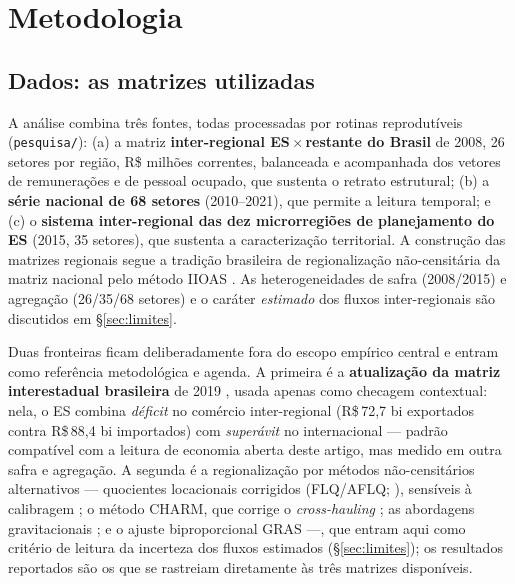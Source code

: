 \documentclass[11pt,a4paper]{article}
\begin{document}
\section{Metodologia}
\label{sec:metodo}
\subsection{Dados: as matrizes utilizadas}
\label{sec:dados}
A análise combina três fontes, todas processadas por rotinas reprodutíveis
(\texttt{pesquisa/}): (a) a matriz \textbf{inter-regional ES\,$\times$\,restante do
Brasil} de 2008, 26 setores por região, R\$ milhões correntes, balanceada e
acompanhada dos vetores de remunerações e de pessoal ocupado, que sustenta o retrato
estrutural; (b) a \textbf{série nacional de 68 setores} (2010--2021), que permite a leitura temporal; e (c) o \textbf{sistema inter-regional das dez microrregiões de planejamento do ES} (2015, 35 setores), que sustenta a caracterização territorial. A construção das matrizes regionais segue a tradição brasileira de regionalização não-censitária da matriz nacional \citep{guilhoto2005estimacao,round1983nonsurvey} pelo método IIOAS \citep{haddad2017iioas}. As heterogeneidades de safra (2008/2015) e agregação
(26/35/68 setores) e o caráter \emph{estimado} dos fluxos inter-regionais são
discutidos em \S\ref{sec:limites}.

Duas fronteiras ficam deliberadamente fora do escopo empírico central e entram como referência metodológica e agenda. A primeira é a \textbf{atualização da matriz
interestadual brasileira} de 2019 \citep{haddad2025matriz}, usada apenas como checagem contextual: nela, o ES combina \emph{déficit} no comércio inter-regional (R\$\,72,7 bi exportados contra R\$\,88,4 bi importados) com \emph{superávit} no internacional ---
padrão compatível com a leitura de economia aberta deste artigo, mas medido em outra safra e agregação. A segunda é a regionalização por métodos não-censitários alternativos --- quocientes locacionais corrigidos (FLQ/AFLQ; \citealp{flegg1995lq,flegg2000flq}), sensíveis à calibragem \citep{flegg2016evaluating}; o método CHARM, que corrige o \emph{cross-hauling} \citep{tobben2015charm}; as abordagens gravitacionais \citep{riddington2006comparison}; e o ajuste biproporcional GRAS \citep{junius2003gras} ---, que entram aqui como critério de leitura da incerteza dos fluxos estimados (\S\ref{sec:limites}); os resultados reportados são os que se rastreiam diretamente às três matrizes disponíveis.
\end{document}
